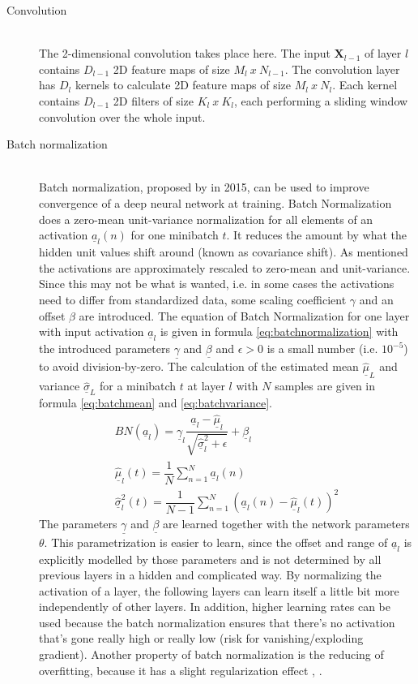 \documentclass[12pt,DIV14,BCOR12mm,a4paper,footexclude,headinclude,halfparskip-,twoside,openright,openany,cleardoubleempty,idxtotoc,bibtotoc]{scrreprt} %
\numberwithin{equation}{chapter}
\begin{document}
\begin{description}
	\item[Convolution]\hfill \\
The 2-dimensional convolution takes place here. The input $\mathbf{X}_{l-1}$ of layer $l$ contains $D_{l-1}$ 2D feature maps of size $M_l\ x\ N_{l-1}			$. The convolution layer has $D_l$ kernels to calculate 2D feature maps of size $M_l\ x\ N_l$. Each kernel contains $D_{l-1}$ 2D filters of size $K_l\ 		x\ K_l$, each performing a sliding window convolution over the whole input.
	\item[Batch normalization]\hfill \\
Batch normalization, proposed by \cite{Ioffe15BatchNorm} in 2015, can be used to improve convergence of a deep neural network at training. Batch 				Normalization does a zero-mean unit-variance normalization for all elements of an activation $\underline{a}_l(n)$ for one minibatch $t$. It reduces the amount by what the hidden unit values shift around (known as covariance shift). As mentioned the activations are approximately rescaled to zero-mean and unit-variance. Since this may not be what is wanted, i.e. in some cases the activations need to differ from standardized data, some scaling coefficient $\gamma$ and an offset $\beta$ are introduced. The equation of Batch Normalization for one layer with input activation $\underline{a}_l$ is given in formula \ref{eq:batchnormalization} with the introduced parameters $\underline{\gamma}$ and $\underline{\beta}$ and $\epsilon > 0$ is a small number (i.e. $10^{-5}$) to avoid division-by-zero. The calculation of the estimated mean $\underline{\hat{\mu}}_L$ and variance $\underline{\hat{\sigma}}_L$ for a minibatch $t$ at layer $l$ with  $N$ samples are given in formula \ref{eq:batchmean} and \ref{eq:batchvariance}.
\begin{align}
	BN(\underline{a}_l) = \underline{\gamma}_l\dfrac{\underline{a}_l-\underline{\hat{\mu}}_l}{\sqrt{\underline{\hat{\sigma}}_{l}^{2}+\epsilon}}+\underline{\beta}_l\label{eq:batchnormalization}\\
	\underline{\hat{\mu}}_l(t) = \dfrac{1}{N}\sum_{n=1}^{N}\underline{a}_l(n)\label{eq:batchmean}\\
	\underline{\hat{\sigma}}_{l}^{2}(t) = \dfrac{1}{N-1}\sum_{n=1}^{N}(\underline{a}_l(n)-\underline{\hat{\mu}}_l(t))^{2}\label{eq:batchvariance}
\end{align}		
The parameters $\underline{\gamma}$ and $\underline{\beta}$ are learned together with the network parameters $\theta$. This parametrization is easier to learn, since the offset and range of $\underline{a}_l$ is explicitly modelled by those parameters and is not determined by all previous layers in a hidden and complicated way. By normalizing the activation of a layer, the following layers can learn itself a little bit more independently of other layers. In addition, higher learning rates can be used because the batch normalization ensures that there's no activation that's gone really high or really low (risk for vanishing/exploding gradient). Another property of batch normalization is the reducing of overfitting, because it has a slight regularization effect \cite{DeepLearningDive}, \cite{LectureNotes_DeepLearning}.

\end{description}
\end{document}

